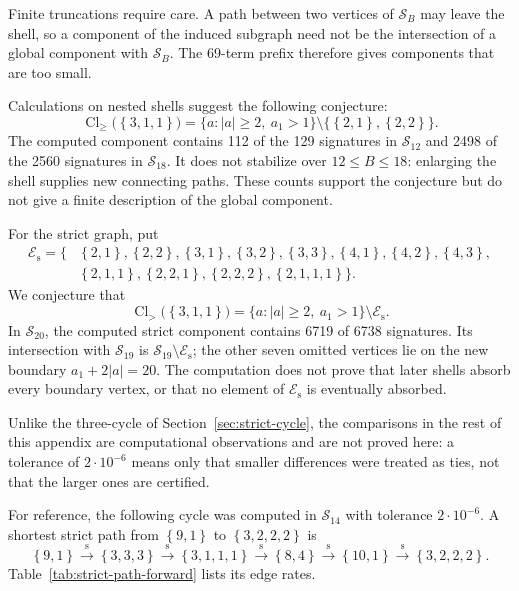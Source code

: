 \documentclass[11pt]{article}
\theoremstyle{definition}
\theoremstyle{remark}
\newcommand{\sig}[1]{\left\{#1\right\}}
\begin{document}
Finite truncations require care.  A path between two vertices of
\(\mathcal S_B\) may leave the shell, so a component of the induced subgraph
need not be the intersection of a global component with \(\mathcal S_B\).
The 69-term prefix therefore gives components that are too small.

Calculations on nested shells suggest the following conjecture:
\[
  \operatorname{Cl}_{\geq}\bigl(\sig{3,1,1}\bigr)
  =
  \{a:|a|\geq2,\ a_1>1\}
  \setminus\{\sig{2,1},\sig{2,2}\}.
\]
The computed component contains 112 of the 129 signatures in
\(\mathcal S_{12}\) and 2498 of the 2560 signatures in \(\mathcal S_{18}\).
It does not stabilize over \(12\leq B\leq18\): enlarging the shell supplies
new connecting paths.  These counts support the conjecture but do not give a
finite description of the global component.

For the strict graph, put
\[
\begin{split}
  \mathcal E_{\mathrm{s}}=\{&
    \sig{2,1},\sig{2,2},
    \sig{3,1},\sig{3,2},\sig{3,3},
    \sig{4,1},\sig{4,2},\sig{4,3},\\
    &\sig{2,1,1},\sig{2,2,1},\sig{2,2,2},
    \sig{2,1,1,1}\}.
\end{split}
\]
We conjecture that
\[
  \operatorname{Cl}_{>}\bigl(\sig{3,1,1}\bigr)
  =
  \{a:|a|\geq2,\ a_1>1\}\setminus\mathcal E_{\mathrm{s}}.
\]
In \(\mathcal S_{20}\), the computed strict component contains 6719 of 6738
signatures.  Its intersection with \(\mathcal S_{19}\) is
\(\mathcal S_{19}\setminus\mathcal E_{\mathrm{s}}\); the other seven omitted
vertices lie on the new boundary \(a_1+2|a|=20\).  The computation does not
prove that later shells absorb every boundary vertex, or that no element of
\(\mathcal E_{\mathrm{s}}\) is eventually absorbed.

Unlike the three-cycle of Section~\ref{sec:strict-cycle}, the comparisons in
the rest of this appendix are computational observations and are not proved
here: a tolerance of \(2\cdot10^{-6}\) means only that smaller differences
were treated as ties, not that the larger ones are certified.

For reference, the following cycle was computed in \(\mathcal S_{14}\) with
tolerance \(2\cdot10^{-6}\).  A shortest strict path from \(\sig{9,1}\) to
\(\sig{3,2,2,2}\) is
\[
  \sig{9,1}
  \overset{\mathrm{s}}{\longrightarrow}\sig{3,3,3}
  \overset{\mathrm{s}}{\longrightarrow}\sig{3,1,1,1}
  \overset{\mathrm{s}}{\longrightarrow}\sig{8,4}
  \overset{\mathrm{s}}{\longrightarrow}\sig{10,1}
  \overset{\mathrm{s}}{\longrightarrow}\sig{3,2,2,2}.
\]
Table~\ref{tab:strict-path-forward} lists its edge rates.
\end{document}
